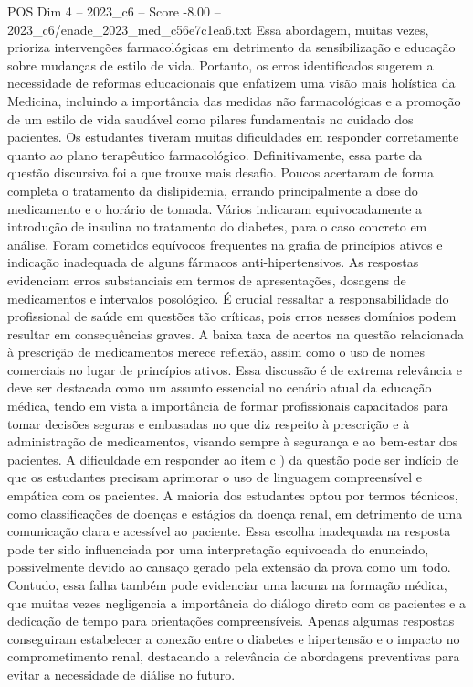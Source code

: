 \begin{textsample}{POS Dim 4 – 2023\_c6 – Score -8.00 – 2023\_c6/enade\_2023\_med\_c56e7c1ea6.txt}
Essa abordagem, muitas vezes, prioriza intervenções farmacológicas em detrimento da sensibilização e educação sobre mudanças de estilo de vida.
Portanto, os erros identificados sugerem a necessidade de reformas educacionais que enfatizem uma visão mais holística da Medicina, incluindo a importância das medidas não farmacológicas e a promoção de um estilo de vida saudável como pilares fundamentais no cuidado dos pacientes.
Os estudantes tiveram muitas dificuldades em responder corretamente quanto ao plano terapêutico farmacológico.
Definitivamente, essa parte da questão discursiva foi a que trouxe mais desafio.
Poucos acertaram de forma completa o tratamento da dislipidemia, errando principalmente a dose do medicamento e o horário de tomada.
Vários indicaram equivocadamente a introdução de insulina no tratamento do diabetes, para o caso concreto em análise.
Foram cometidos equívocos frequentes na grafia de princípios ativos e indicação inadequada de alguns fármacos anti-hipertensivos.
As respostas evidenciam erros substanciais em termos de apresentações, dosagens de medicamentos e intervalos posológico.
É crucial ressaltar a responsabilidade do profissional de saúde em questões tão críticas, pois erros nesses domínios podem resultar em consequências graves.
A baixa taxa de acertos na questão relacionada à prescrição de medicamentos merece reflexão, assim como o uso de nomes comerciais no lugar de princípios ativos.
Essa discussão é de extrema relevância e deve ser destacada como um assunto essencial no cenário atual da educação médica, tendo em vista a importância de formar profissionais capacitados para tomar decisões seguras e embasadas no que diz respeito à prescrição e à administração de medicamentos, visando sempre à segurança e ao bem-estar dos pacientes.
A dificuldade em responder ao item c ) da questão pode ser indício de que os estudantes precisam aprimorar o uso de linguagem compreensível e empática com os pacientes.
A maioria dos estudantes optou por termos técnicos, como classificações de doenças e estágios da doença renal, em detrimento de uma comunicação clara e acessível ao paciente.
Essa escolha inadequada na resposta pode ter sido influenciada por uma interpretação equivocada do enunciado, possivelmente devido ao cansaço gerado pela extensão da prova como um todo.
Contudo, essa falha também pode evidenciar uma lacuna na formação médica, que muitas vezes negligencia a importância do diálogo direto com os pacientes e a dedicação de tempo para orientações compreensíveis.
Apenas algumas respostas conseguiram estabelecer a conexão entre o diabetes e hipertensão e o impacto no comprometimento renal, destacando a relevância de abordagens preventivas para evitar a necessidade de diálise no futuro.

\end{textsample}
